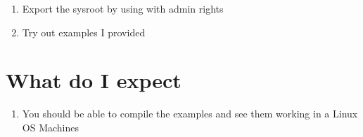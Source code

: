 \documentclass[a4paper,11pt,openany,oneside,english]{sphinxmanual}
\begin{document}
\begin{enumerate}
\begin{quote}
\begin{sphinxVerbatim}[commandchars=\\\{\}]
dockerpulldebian:bookworm
dockerrun\PYGZhy{}it\PYGZhy{}\PYGZhy{}namedebdebian:bookworm
aptupdateaptinstallaptinstalllibc6\PYGZhy{}devlibstdc++\PYGZhy{}12\PYGZhy{}devlibc++\PYGZhy{}devlibc++abi\PYGZhy{}devlibwayland\PYGZhy{}dev
exitdockerdeb\PYGZhy{}odeb.tar
\end{sphinxVerbatim}
\end{quote}

\item {} 
\sphinxAtStartPar
Export the sysroot by using  with admin rights

\item {} 
\sphinxAtStartPar
Try out examples I provided

\end{enumerate}


\chapter{What do I expect}
\label{\detokenize{index:what-do-i-expect}}\begin{enumerate}
%
\item {} 
\sphinxAtStartPar
You should be able to compile the examples and see them working in a
Linux OS Machines

\end{enumerate}



\renewcommand{\indexname}{Index}
\printindex
\end{document}
